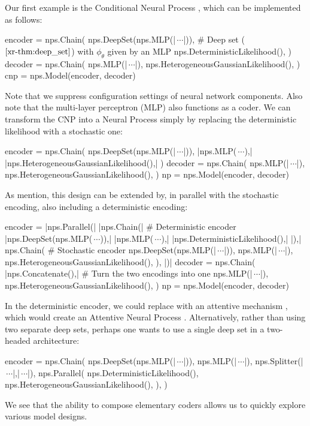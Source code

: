 \documentclass[12pt, twoside]{report}
\newcommand{\xrprefix}[1]{xr-#1}
\begin{document}
Our first example is the Conditional Neural Process \parencite[CNP;][]{Garnelo:2018:Conditional_Neural_Processes}, which
can be implemented as follows:
\begin{pythoncode}{\small}{}
encoder = nps.Chain(
    nps.DeepSet(nps.MLP(|$\,\cdots$|)),   # Deep set ($\text{\cref{\xrprefix{thm:deep_set}}}$) with $\phi_\theta$ given by an MLP
    nps.DeterministicLikelihood(),
)
decoder = nps.Chain(
    nps.MLP(|$\,\cdots$|),
    nps.HeterogeneousGaussianLikelihood(),
)
cnp = nps.Model(encoder, decoder)
\end{pythoncode}
Note that we suppress configuration settings of neural network components.
Also note that the multi-layer perceptron (MLP) also functions as a coder.
We can transform the CNP into a Neural Process \parencite[NP;][]{Garnelo:2018:Neural_Processes} simply by replacing the deterministic likelihood with a stochastic one:
\begin{pythoncode}{\small}{}
encoder = nps.Chain(
    nps.DeepSet(nps.MLP(|$\,\cdots$|)),
    |\textcolor{redaccent}{nps.MLP($\,\cdots$),}|
    |\textcolor{redaccent}{nps.HeterogeneousGaussianLikelihood(),}|
)
decoder = nps.Chain(
    nps.MLP(|$\,\cdots$|),
    nps.HeterogeneousGaussianLikelihood(),
)
np = nps.Model(encoder, decoder)
\end{pythoncode}
As \textcite{Garnelo:2018:Neural_Processes} mention, this design can be extended by, in parallel with the stochastic encoding, also including a deterministic encoding:
\begin{pythoncode}{\small}{}
encoder = |\textcolor{redaccent}{nps.Parallel(}|
    |\textcolor{redaccent}{nps.Chain(}|  # Deterministic encoder
        |\textcolor{redaccent}{nps.DeepSet(nps.MLP($\,\cdots$)),}|
        |\textcolor{redaccent}{nps.MLP($\,\cdots$),}|
        |\textcolor{redaccent}{nps.DeterministicLikelihood(),}|
    |\textcolor{redaccent}{),}|
    nps.Chain(  # Stochastic encoder
        nps.DeepSet(nps.MLP(|$\,\cdots$|)),
        nps.MLP(|$\,\cdots$|),
        nps.HeterogeneousGaussianLikelihood(),
    ),
|\textcolor{redaccent}{)}|
decoder = nps.Chain(
    |\textcolor{redaccent}{nps.Concatenate(),}|  # Turn the two encodings into one
    nps.MLP(|$\,\cdots$|),
    nps.HeterogeneousGaussianLikelihood(),
)
np = nps.Model(encoder, decoder)
\end{pythoncode}
In the deterministic encoder, we could replace  with an attentive mechanism , which would create an Attentive Neural Process \parencite[ANP;][]{Kim:2019:Attentive_Neural_Processes}.
Alternatively, rather than using two separate deep sets, perhaps one wants to use a single deep set in a two-headed architecture:
\begin{pythoncode}{\small}{}
encoder = nps.Chain(
    nps.DeepSet(nps.MLP(|$\,\cdots$|)),
    nps.MLP(|$\,\cdots$|),
    nps.Splitter(|$\,\cdots$|,|$\,\cdots$|),
    nps.Parallel(
        nps.DeterministicLikelihood(),
        nps.HeterogeneousGaussianLikelihood(),
    ),
)
\end{pythoncode}
We see that the ability to compose elementary coders allows us to quickly explore various model designs.
\end{document}
